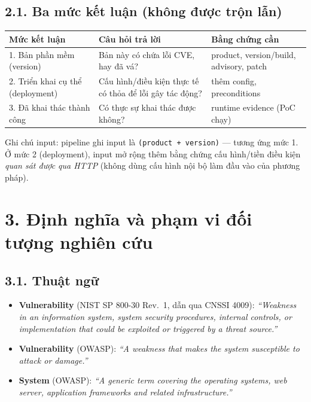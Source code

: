 \documentclass[11pt,a4paper]{article}
\begin{document}
\subsection*{2.1. Ba mức kết luận (không được trộn lẫn)}

\begin{center}
\begin{tabular}{@{}p{3.2cm}p{5.0cm}p{7.2cm}@{}}
\toprule
\textbf{Mức kết luận} & \textbf{Câu hỏi trả lời} & \textbf{Bằng chứng cần} \\
\midrule
1. Bản phần mềm (version) & Bản này có chứa lỗi CVE, hay đã vá? & product, version/build, advisory, patch \\
2. Triển khai cụ thể (deployment) & Cấu hình/điều kiện thực tế có thỏa để lỗi gây tác động? & thêm config, preconditions \\
3. Đã khai thác thành công & Có thực sự khai thác được không? & runtime evidence (PoC chạy) \\
\bottomrule
\end{tabular}
\end{center}

Ghi chú input: pipeline ghi input là \texttt{(product + version)} — tương ứng mức 1. Ở mức 2 (deployment), input mở rộng thêm bằng chứng cấu hình/tiền điều kiện \emph{quan sát được qua HTTP} (không dùng cấu hình nội bộ làm đầu vào của phương pháp).

\section*{3. Định nghĩa và phạm vi đối tượng nghiên cứu}

\subsection*{3.1. Thuật ngữ}

\begin{itemize}
  \item \textbf{Vulnerability} (NIST SP 800-30 Rev.~1, dẫn qua CNSSI 4009): \emph{``Weakness in an information system, system security procedures, internal controls, or implementation that could be exploited or triggered by a threat source.''} \cite{nist}
  \item \textbf{Vulnerability} (OWASP): \emph{``A weakness that makes the system susceptible to attack or damage.''} \cite{owasp}
  \item \textbf{System} (OWASP): \emph{``A generic term covering the operating systems, web server, application frameworks and related infrastructure.''} \cite{owasp}
\end{itemize}
\end{document}
